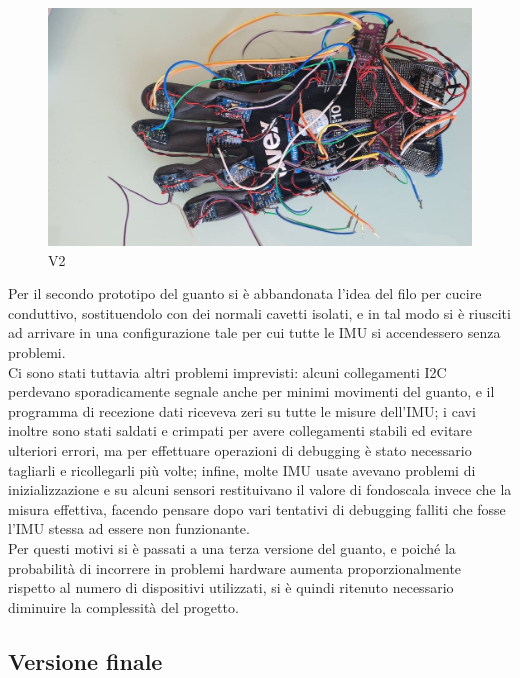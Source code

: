 \begin{figure}[H]
    \includegraphics[scale=0.35]{immagini/prototipo2.jpg}
    \centering
    \caption{V2}
\end{figure}

Per il secondo prototipo del guanto si è abbandonata l'idea del filo per cucire conduttivo, sostituendolo con dei normali cavetti isolati, e in tal modo si è riusciti ad arrivare in una configurazione tale per cui tutte le IMU si accendessero senza problemi.\\

Ci sono stati tuttavia altri problemi imprevisti: alcuni collegamenti I2C perdevano sporadicamente segnale anche per minimi movimenti del guanto, e il programma di recezione dati riceveva zeri su tutte le misure dell'IMU; i cavi inoltre sono stati saldati e crimpati per avere collegamenti stabili ed evitare ulteriori errori, ma per effettuare operazioni di debugging è stato necessario tagliarli e ricollegarli più volte; infine, molte IMU usate avevano problemi di inizializzazione e su alcuni sensori restituivano il valore di fondoscala invece che la misura effettiva, facendo pensare dopo vari tentativi di debugging falliti che fosse l'IMU stessa ad essere non funzionante.\\

Per questi motivi si è passati a una terza versione del guanto, e poiché la probabilità di incorrere in problemi hardware aumenta proporzionalmente rispetto al numero di dispositivi utilizzati, si è quindi ritenuto necessario diminuire la complessità del progetto.

\clearpage

\subsection{Versione finale}

